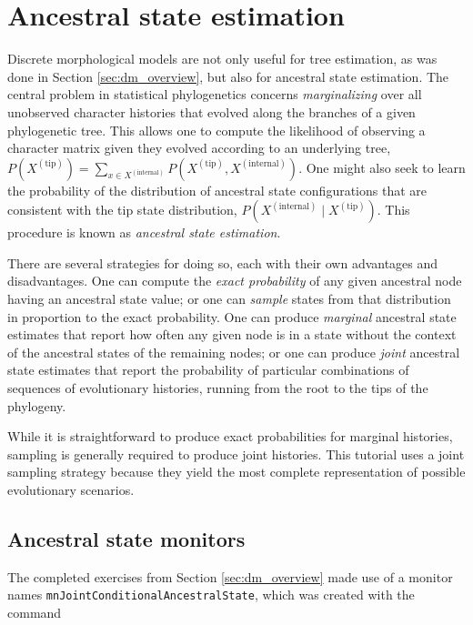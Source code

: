 \section{Ancestral state estimation} \label{sec:dm_matrix}

Discrete morphological models are not only useful for tree estimation, as was done in Section \ref{sec:dm_overview}, but also for ancestral state estimation.
The central problem in statistical phylogenetics concerns {\it marginalizing} over all unobserved character histories that evolved along the branches of a given phylogenetic tree.
This allows one to compute the likelihood of observing a character matrix given they evolved according to an underlying tree, $P( X^{(\text{tip})} ) = \sum_{x \in X^{(\text{internal})}} P( X^{(\text{tip})}, X^{(\text{internal})} )$.
One might also seek to learn the probability of the distribution of ancestral state configurations that are consistent with the tip state distribution, $P( X^{(\text{internal})} \mid X^{(\text{tip})} )$.
This procedure is known as {\it ancestral state estimation}.

There are several strategies for doing so, each with their own advantages and disadvantages.
One can compute the {\it exact probability} of any given ancestral node having an ancestral state value; or one can {\it sample} states from that distribution in proportion to the exact probability.
One can produce {\it marginal} ancestral state estimates that report how often any given node is in a state without the context of the ancestral states of the remaining nodes; or one can produce {\it joint} ancestral state estimates that report the probability of particular combinations of sequences of evolutionary histories, running from the root to the tips of the phylogeny.

While it is straightforward to produce exact probabilities for marginal histories, sampling is generally required to produce joint histories.
This tutorial uses a joint sampling strategy because they yield the most complete representation of possible evolutionary scenarios.

\subsection{Ancestral state monitors}

The completed exercises from Section \ref{sec:dm_overview} made use of a monitor names {\tt mnJointConditionalAncestralState}, which was created with the command


